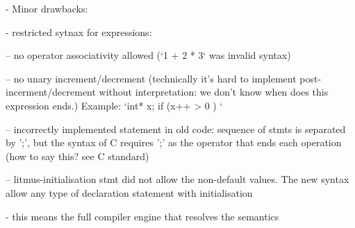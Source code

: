 - Minor drawbacks:

    - restricted sytnax for expressions:

    -- no operator associativity allowed (`1 + 2 * 3` was invalid syntax)

    -- no unary increment/decrement (technically it's hard to implement post-incerment/decrement without interpretation: we don't know when does this expression ends.)
    Example:
    `int* x;
    if (x++ > 0 ) { }`

    -- incorrectly implemented statement in old code: sequence of stmts is separated by ';', but the syntax of C requires ';' as the operator that ends each operation (how to say this? see C standard)

    -- litmus-initialisation  stmt did not allow the non-default values. The new syntax allow any type of declaration statement with initialisation

- this means the full compiler engine that resolves the semantics





